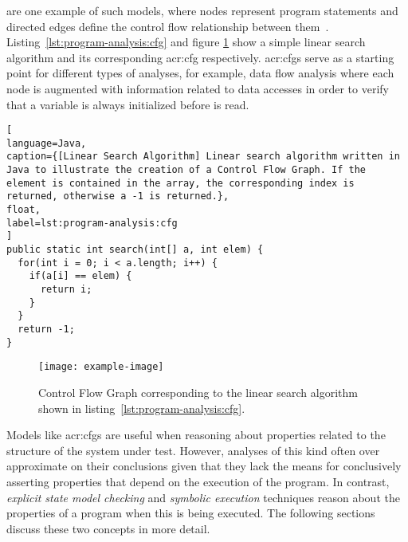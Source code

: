 \textit{} are one example of such models, where nodes represent program statements and directed edges define the control flow relationship between them~\cite{Allen1970}. Listing~\ref{lst:program-analysis:cfg} and figure \ref{fig:program-analysis:cfg} show a simple linear search algorithm and its corresponding \acrlong{acr:cfg} respectively. \acrshort{acr:cfg}s serve as a starting point for different types of analyses, for example, data flow analysis where each node is augmented with information related to data accesses in order to verify that a variable is always initialized before is read. 

\begin{lstlisting}[
language=Java,
caption={[Linear Search Algorithm] Linear search algorithm written in Java to illustrate the creation of a Control Flow Graph. If the element is contained in the array, the corresponding index is returned, otherwise a -1 is returned.},
float,
label=lst:program-analysis:cfg
]
public static int search(int[] a, int elem) {
  for(int i = 0; i < a.length; i++) {
    if(a[i] == elem) {
      return i;
    }
  }
  return -1;
}
\end{lstlisting}

\begin{figure}[t]
\centering
\texttt{[image: example-image]}
\caption[Control Flow Graph of Linear Search]{Control Flow Graph corresponding to the linear search algorithm shown in listing~\ref{lst:program-analysis:cfg}.}
\label{fig:program-analysis:cfg}
\end{figure}

Models like \acrshort{acr:cfg}s are useful when reasoning about properties related to the structure of the system under test. However, analyses of this kind often over approximate on their conclusions given that they lack the means for conclusively asserting properties that depend on the execution of the program. In contrast, \textit{explicit state model checking} and \textit{symbolic execution} techniques reason about the properties of a program when this is being executed. The following sections discuss these two concepts in more detail.


